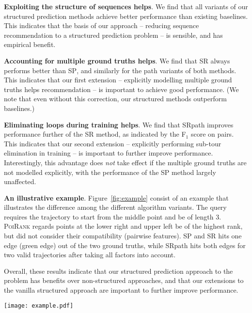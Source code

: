 \textbf{Exploiting the structure of sequences helps}.
We find that all variants of our structured prediction methods achieve better performance than existing baselines.
This indicates that the basis of our approach -- reducing sequence recommendation to a structured prediction problem -- is sensible, and has empirical benefit.

\textbf{Accounting for multiple ground truths helps}.
We find that \textsc{SR} always performs better than \textsc{SP},
and similarly for the {\sc path} variants of both methods.
This indicates that our first extension -- explicitly modelling multiple ground truths helps recommendation -- is important to achieve good performance.
(We note that even without this correction, our structured methods outperform baselines.)

\textbf{Eliminating loops during training helps}.
We find that {\sc SRpath} improves performance further of the {\sc SR} method,
as indicated by the F$_1$ score on pairs.
This indicates that our second extension -- explicitly performing sub-tour elimination in training -- is important to further improve performance.
Interestingly,
this advantage does \emph{not} take effect if the multiple ground truths are not modelled explicitly,
with the performance of the {\sc SP} method largely unaffected.

\textbf{An illustrative example}. Figure~\ref{fig:example} consist of an example that illustrates the difference among the different algorithm variants. The query requires the trajectory to start from the middle point and be of length 3.
\textsc{PoiRank} regards points at the lower right and upper left be of the highest rank, but did not consider their compatibility (\ie pairwise features). {\sc SP} and {\sc SR} hits one edge (green edge) out of the two ground truths, while {\sc SRpath} hits both edges for two valid trajectories after taking all factors into account.

Overall, these results indicate that our structured prediction approach to the problem has
benefits over non-structured approaches,
and that our extensions to the vanilla structured approach are important to further improve performance.


\begin{figure*}[t]
	\centering
	\texttt{[image: example.pdf]}
	\caption{Example of structured recommender versus baseline on a query with two ground truths as shown in Figure (c).
             (a) \textsc{PoiRank} cannot make a recommendation related to any of the ground truths;
             (b) \textsc{SP} and \textsc{SR} recommend a better trajectory than \textsc{PoiRank}, but not fully consistent with the ground truths;
             (c) \textsc{SRpath} hits both ground truths at rank 3 (green edges) and 5 (red edges) respectively.}
	\label{fig:example}
\end{figure*}
